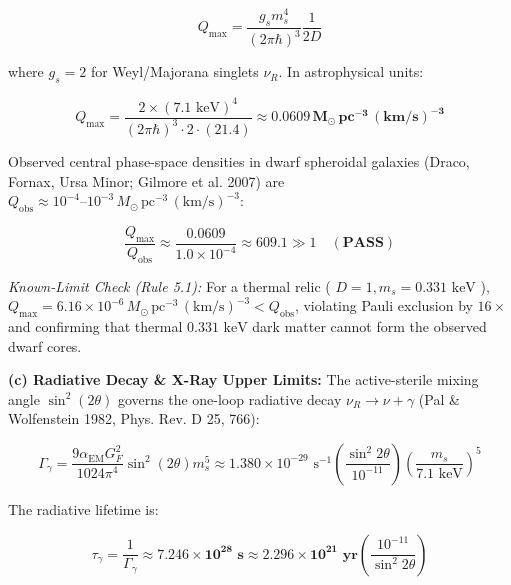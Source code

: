 \documentclass[11pt,a4paper]{article}
\theoremstyle{definition}\newtheorem{definition}{Definition}
\theoremstyle{remark}\newtheorem{remark}{Remark}
\begin{document}
\begin{equation}
Q_{\text{max}} = \frac{g_s m_s^4}{(2\pi\hbar)^3} \frac{1}{2 D}
\end{equation}


where $g_s = 2$ for Weyl/Majorana singlets $\nu_R$. In astrophysical units:


\begin{equation}
Q_{\text{max}} = \frac{2 \times (7.1\text{ keV})^4}{(2\pi\hbar)^3 \cdot 2 \cdot (21.4)} \approx \mathbf{0.0609 \, M_\odot \, \text{pc}^{-3} \, (\text{km/s})^{-3}}
\end{equation}


Observed central phase-space densities in dwarf spheroidal galaxies (Draco, Fornax, Ursa Minor; Gilmore et al. 2007) are $Q_{\text{obs}} \approx 10^{-4}\text{--}10^{-3} \, M_\odot \, \text{pc}^{-3} \, (\text{km/s})^{-3}$:


\begin{equation}
\frac{Q_{\text{max}}}{Q_{\text{obs}}} \approx \frac{0.0609}{1.0 \times 10^{-4}} \approx \mathbf{609.1} \gg 1 \quad (\mathbf{PASS})
\end{equation}


\textit{Known-Limit Check (Rule 5.1):} For a thermal relic ( $D=1, m_s = 0.331\text{ keV}$ ), $Q_{\text{max}} = 6.16 \times 10^{-6} \, M_\odot \, \text{pc}^{-3} \, (\text{km/s})^{-3} < Q_{\text{obs}}$, violating Pauli exclusion by $16\times$ and confirming that thermal $0.331\text{ keV}$ dark matter cannot form the observed dwarf cores.

\textbf{(c) Radiative Decay \& X-Ray Upper Limits:}
The active-sterile mixing angle $\sin^2(2\theta)$ governs the one-loop radiative decay $\nu_R \to \nu + \gamma$ (Pal \& Wolfenstein 1982, Phys. Rev. D 25, 766):


\begin{equation}
\Gamma_\gamma = \frac{9 \alpha_{\text{EM}} G_F^2}{1024 \pi^4} \sin^2(2\theta) m_s^5 \approx 1.380 \times 10^{-29}\text{ s}^{-1} \left(\frac{\sin^2 2\theta}{10^{-11}}\right) \left(\frac{m_s}{7.1\text{ keV}}\right)^5
\end{equation}


The radiative lifetime is:


\begin{equation}
\tau_\gamma = \frac{1}{\Gamma_\gamma} \approx \mathbf{7.246 \times 10^{28}\text{ s}} \approx \mathbf{2.296 \times 10^{21}\text{ yr}} \left(\frac{10^{-11}}{\sin^2 2\theta}\right)
\end{equation}
\end{document}
